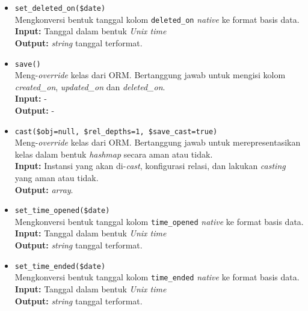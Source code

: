 \begin{itemize}
\begin{itemize}
                \item \texttt{set\_deleted\_on(\$date)} \\
                    Mengkonversi bentuk tanggal kolom \texttt{deleted\_on} \textit{native} ke 
                    format basis data. \\
                    \textbf{Input:} Tanggal dalam bentuk \textit{Unix time}\\
                    \textbf{Output:} \textit{string} tanggal terformat.
                    
                \item \texttt{save()}\\
                    Meng-\textit{override} kelas dari ORM. Bertanggung jawab untuk mengisi
                    kolom \textit{created\_on}, \textit{updated\_on} dan \textit{deleted\_on}.\\
                    \textbf{Input:} -\\
                    \textbf{Output:} -
                
                \item \texttt{cast(\$obj=null, \$rel\_depths=1, \$save\_cast=true)}\\
                    Meng-\textit{override} kelas dari ORM. Bertanggung jawab untuk merepresentasikan
                    kelas dalam bentuk \textit{hashmap} secara aman atau tidak. \\
                    \textbf{Input:} Instansi yang akan di-\textit{cast}, konfigurasi relasi, dan
                        lakukan \textit{casting} yang aman atau tidak.\\
                    \textbf{Output:} \textit{array}.
                    
                \item \texttt{set\_time\_opened(\$date)} \\
                     Mengkonversi bentuk tanggal kolom \texttt{time\_opened} \textit{native} ke 
                    format basis data. \\
                    \textbf{Input:} Tanggal dalam bentuk \textit{Unix time}\\
                    \textbf{Output:} \textit{string} tanggal terformat.
                
                \item \texttt{set\_time\_ended(\$date)} \\
                    Mengkonversi bentuk tanggal kolom \texttt{time\_ended} \textit{native} ke 
                    format basis data. \\
                    \textbf{Input:} Tanggal dalam bentuk \textit{Unix time}\\
                    \textbf{Output:} \textit{string} tanggal terformat.
                

\end{itemize}
\end{itemize}
